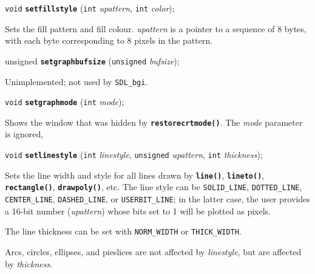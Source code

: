 \documentclass[a4paper,12pt]{article}
\newcommand{\SDLbgi}{\texttt{SDL\_bgi}}
\newcommand{\V}{\texttt{void}}      %
\newcommand{\I}{\texttt{int}}       %
\newcommand{\func}[1]{\textbf{\texttt{#1}}}  %
\newcommand{\A}[1]{\emph{#1}}       %
\newcommand{\T}[1]{\texttt{#1}}     %
\newenvironment{bgi}
{ %
  \begin{snugshade}
}
{ %
  \end{snugshade}
}
\begin{document}

\label{sec:setfillstyle}

\begin{bgi}
\V{} \func{setfillstyle} (\I{} \A{upattern}, \I{} \A{color});
\end{bgi}

Sets the fill pattern and fill colour. \A{upattern} is a pointer to a
sequence of 8 bytes, with each byte corresponding to 8 pixels in the
pattern.


\label{sec:setgraphbufsize}

\begin{bgi}
unsigned \func{setgraphbufsize} (\texttt{unsigned} \A{bufsize});
\end{bgi}

Unimplemented; not used by \SDLbgi.


\label{sec:setgraphmode}

\begin{bgi}
\V{} \func{setgraphmode} (\I{} \A{mode});
\end{bgi}

Shows the window that was hidden by \func{restorecrtmode()}. The
\A{mode} parameter is ignored,


\label{sec:setlinestyle}

\begin{bgi}
\V{} \func{setlinestyle} (\I{} \A{linestyle}, \texttt{unsigned}
\A{upattern}, \I{} \A{thickness});
\end{bgi}

Sets the line width and style for all lines drawn by \func{line()},
\func{lineto()}, \func{rectangle()}, \func{drawpoly()}, etc. The line
style can be \T{SOLID\_LINE}, \T{DOTTED\_LINE}, \T{CENTER\_LINE},
\T{DASHED\-\_LINE}, or \T{USERBIT\_LINE}; in the latter case, the user
provides a 16-bit number (\A{upattern}) whose bits set to 1 will be
plotted as pixels.

The line thickness can be set with \T{NORM\_WIDTH} or
\T{THICK\-\_WIDTH}.

Arcs, circles, ellipses, and pieslices are not affected by
\A{linestyle}, but are affected by \A{thickness}.
\end{document}
